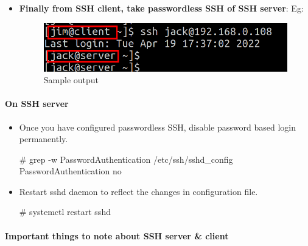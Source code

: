 \begin{flushleft}
\begin{itemize}
\begin{itemize}
		\end{itemize}			
	\newpage
	
	\item \textbf{Finally from SSH client, take passwordless SSH of SSH server}:
		Eg:
	\begin{figure}[h!]
		\centering
		\includegraphics[scale=0.4]{content/chapter19/images/ssh07.png}
		\caption{Sample output}
		\label{fig:stage55693}
	\end{figure}
	
\end{itemize}		

\paragraph{On SSH server}

\begin{itemize}
	\item 	Once you have configured passwordless SSH, disable password based login permanently.
	
	\begin{tcolorbox}[breakable,notitle,boxrule=-0pt,colback=black,colframe=black]
		\color{green}
		\# grep  -w  PasswordAuthentication   /etc/ssh/sshd\_config 
		\newline
		\color{white}
		PasswordAuthentication no
		\font=4pt
	\end{tcolorbox}
	\item 	Restart sshd daemon to reflect the changes in configuration file.
	
	\bigskip
	\begin{tcolorbox}[breakable,notitle,boxrule=-0pt,colback=black,colframe=black]
		\color{green}
		\font=9pt
		\# systemctl restart sshd
		\font=4pt
	\end{tcolorbox}
	
\end{itemize}
\bigskip
\bigskip
\paragraph{Important things to note about SSH server \& client}
		

\end{flushleft}
